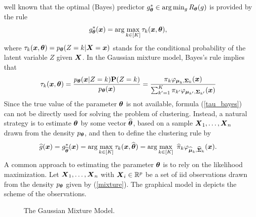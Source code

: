 well known that the optimal (Bayes) predictor $g^*_{\boldsymbol\theta} \in \arg\min_g R_{\boldsymbol\theta}(g)$ is provided by the rule
$$
g^*_{\boldsymbol\theta}(\boldsymbol x) = \arg\max_{k\in [K]} \tau_k(\boldsymbol x,{\boldsymbol\theta}),
$$
where $\tau_k(\boldsymbol x,{\boldsymbol\theta})=p_{{\boldsymbol\theta}}(Z=k|\boldsymbol X=\boldsymbol x)$ stands for the conditional probability of the latent variable $Z$ given $\boldsymbol X$.
In the Gaussian mixture model, Bayes's rule implies that
\begin{equation}
\label{tau_bayes}
\tau_k(\boldsymbol x,{\boldsymbol\theta})=\frac{p_{{\boldsymbol\theta}}(\boldsymbol x|Z=k)\mathbf P(Z=k)}{p_{{\boldsymbol\theta}}(\boldsymbol x)}
=\frac{\pi_k\varphi_{\boldsymbol\mu_k,\boldsymbol\Sigma_k}(\boldsymbol x)}{\sum_{k'=1}^K\pi_{k'}\varphi_{\boldsymbol\mu_{k'},\boldsymbol\Sigma_{k'}}(\boldsymbol x)}
\end{equation}
Since the true value of the parameter ${\boldsymbol\theta}$ is not available, formula (\ref{tau_bayes}) can not be
directly used for solving the problem of clustering. Instead, a natural strategy is to estimate ${\boldsymbol\theta}$
by some vector $\widehat{{\boldsymbol\theta}}$, based on a sample $\boldsymbol X_1,\ldots,\boldsymbol X_n$ drawn from the density $p_{\boldsymbol\theta}$, and
then to define the clustering rule by
\begin{equation}
\label{gen_clust}
\widehat g(\boldsymbol x) = g^*_{\widehat{{\boldsymbol\theta}}}(\boldsymbol x)=\arg\max_{k\in [K]} \tau_k(\boldsymbol x,\widehat{{\boldsymbol\theta}})=\arg\max_{k\in [K]}\
\widehat\pi_k\varphi_{\widehat{\boldsymbol\mu}_k,\widehat{\boldsymbol\Sigma}_k}(\boldsymbol x).
\end{equation}
A common approach to estimating the parameter ${\boldsymbol\theta}$ is to rely on the likelihood maximization. Let $\boldsymbol X_1,\dots,\boldsymbol X_n$ with $\boldsymbol X_i\in {\mathbb R}^p$ be a set of iid observations drawn from the density $p_{{\boldsymbol\theta}}$
given by (\ref{mixture}). The graphical model in \Cref{fig:grap_model_gmm} depicts the scheme of the observations.
\begin{figure}[h]
\centering\small
{}
\label{fig:grap_model_gmm}
\caption{The Gaussian Mixture Model.}
\end{figure}
